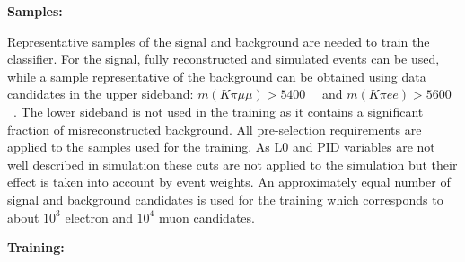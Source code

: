 {\bf Samples:}

Representative samples of the signal and background are needed to train the classifier.
For the signal, fully reconstructed \BdToKstmm and \BdKstee simulated events can be used,
while a sample representative of the background can be obtained using data candidates
in the upper \Bz sideband: $m(K\pi\mu\mu) > 5400$~\mevcc~ and $m(K\pi ee) > 5600$~\mevcc.
The lower sideband is not used in the training as it contains a significant fraction of misreconstructed background.
All pre-selection requirements are applied to the samples used for the training.
As L0 and PID variables are not well described in simulation these cuts are not applied to the simulation
but their effect is taken into account by event weights.
An approximately equal number of signal and background candidates is used for the training
which corresponds to about $10^3$ electron and $10^4$ muon candidates.

{\bf Training:}

